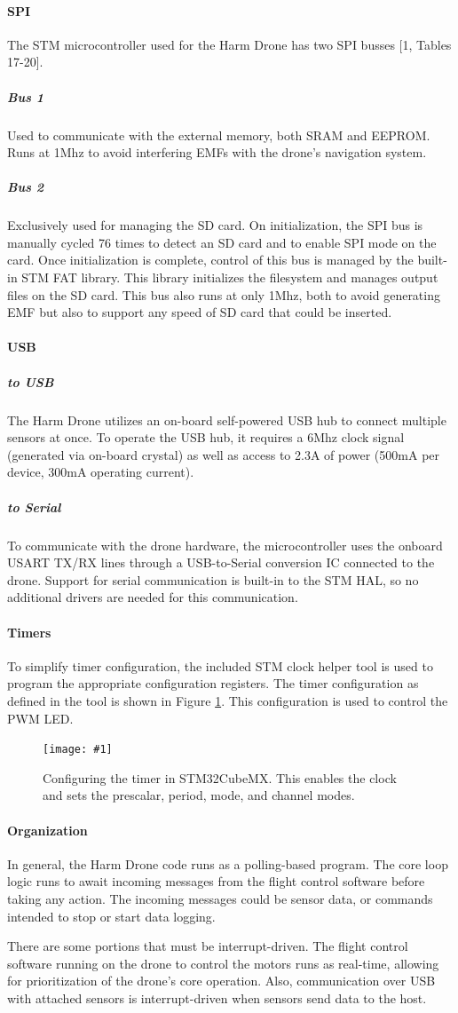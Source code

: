 \documentclass[12pt]{article}
\newcommand{\quickfigure}[4]{%
\begin{figure}[!htbp]
\centering
\texttt{[image: \#1]}
\caption{#3}
\label{#4}
\end{figure}%
}
\begin{document}
\paragraph{SPI} The STM microcontroller used for the Harm Drone has two SPI busses [1, Tables 17-20].
\subparagraph{Bus 1} Used to communicate with the external memory, both SRAM and EEPROM. Runs at 1Mhz to avoid interfering EMFs with the drone's navigation system.
\subparagraph{Bus 2} Exclusively used for managing the SD card. On initialization, the SPI bus is manually cycled 76 times to detect an SD card and to enable SPI mode on the card. Once initialization is complete, control of this bus is managed by the built-in STM FAT library. This library initializes the filesystem and manages output files on the SD card. This bus also runs at only 1Mhz, both to avoid generating EMF but also to support any speed of SD card that could be inserted.
\paragraph{USB}
\subparagraph{to USB} The Harm Drone utilizes an on-board self-powered USB hub to connect multiple sensors at once. To operate the USB hub, it requires a 6Mhz clock signal (generated via on-board crystal) as well as access to 2.3A of power (500mA per device,  300mA operating current).
\subparagraph{to Serial} To communicate with the drone hardware, the microcontroller uses the onboard USART TX/RX lines through a USB-to-Serial conversion IC connected to the drone. Support for serial communication is built-in to the STM HAL, so no additional drivers are needed for this communication.
\paragraph{Timers}
To simplify timer configuration, the included STM clock helper tool is used to program the appropriate configuration registers. The timer configuration as defined in the tool is shown in Figure \ref{timer-configuration}. This configuration is used to control the PWM LED.
 \quickfigure{timer-configuration.png}{6in}{Configuring the timer in STM32CubeMX. This enables the clock and sets the prescalar, period, mode, and channel modes.}{timer-configuration}

\paragraph{Organization} In general, the Harm Drone code runs as a polling-based program. The core loop logic runs to await incoming messages from the flight control software before taking any action. The incoming messages could be sensor data, or commands intended to stop or start data logging.
\par There are some portions that must be interrupt-driven. The flight control software running on the drone to control the motors runs as real-time, allowing for prioritization of the drone's core operation. Also, communication over USB with attached sensors is interrupt-driven when sensors send data to the host.
\end{document}
